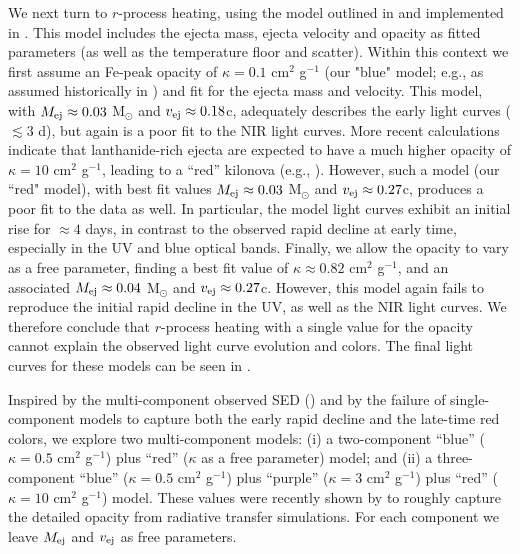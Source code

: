We next turn to $r$-process heating, using the model outlined in \citet{Metzger2017} and implemented in \citet{Villar+17}. This model includes the ejecta mass, ejecta velocity and opacity as fitted parameters (as well as the temperature floor and scatter). Within this context we first assume an Fe-peak opacity of $\kappa = 0.1$ cm$^{2}$ g$^{-1}$ (our "blue" model; e.g., as assumed historically in \citealt{LP98}) and fit for the ejecta mass and velocity.  This model, with $M_{\rm ej}\approx 0.03$ M$_\odot$ and $v_{\rm ej}\approx 0.18$c, adequately describes the early light curves ($\lesssim 3$ d), but again is a poor fit to the NIR light curves.  More recent calculations indicate that lanthanide-rich ejecta are expected to have a much higher opacity of $\kappa = 10$ cm$^{2}$ g$^{-1}$, leading to a ``red'' kilonova (e.g., \citealt{BarnesKasen13}).  However, such a model (our ``red" model), with best fit values $M_{\rm ej}\approx 0.03$ M$_\odot$ and $v_{\rm ej}\approx 0.27$c, produces a poor fit to the data as well.  In particular, the model light curves exhibit an initial rise for $\approx 4$ days, in contrast to the observed rapid decline at early time, especially in the UV and blue optical bands.  Finally, we allow the opacity to vary as a free parameter, finding a best fit value of $\kappa \approx 0.82$ cm$^{2}$ g$^{-1}$, and an associated $M_{\rm ej}\approx 0.04$ M$_\odot$ and $v_{\rm ej}\approx 0.27$c.  However, this model again fails to reproduce the initial rapid decline in the UV, as well as the NIR light curves.  We therefore conclude that $r$-process heating with a single value for the opacity cannot explain the observed light curve evolution and colors. The final light curves for these models can be seen in .

Inspired by the multi-component observed SED () and by the failure of single-component models to capture both the early rapid decline and the late-time red colors, we explore two multi-component models: (i) a two-component ``blue'' ($\kappa = 0.5$ cm$^{2}$ g$^{-1}$) plus ``red'' ($\kappa$ as a free parameter) model; and (ii) a three-component ``blue'' ($\kappa = 0.5$ cm$^{2}$ g$^{-1}$) plus ``purple'' ($\kappa = 3$ cm$^{2}$ g$^{-1}$) plus ``red'' ($\kappa = 10$ cm$^{2}$ g$^{-1}$) model. These values were recently shown by \citet{Tanaka+18} to roughly capture the detailed opacity from radiative transfer simulations. For each component we leave $M_{\rm ej}$ and $v_{\rm ej}$ as free parameters.

